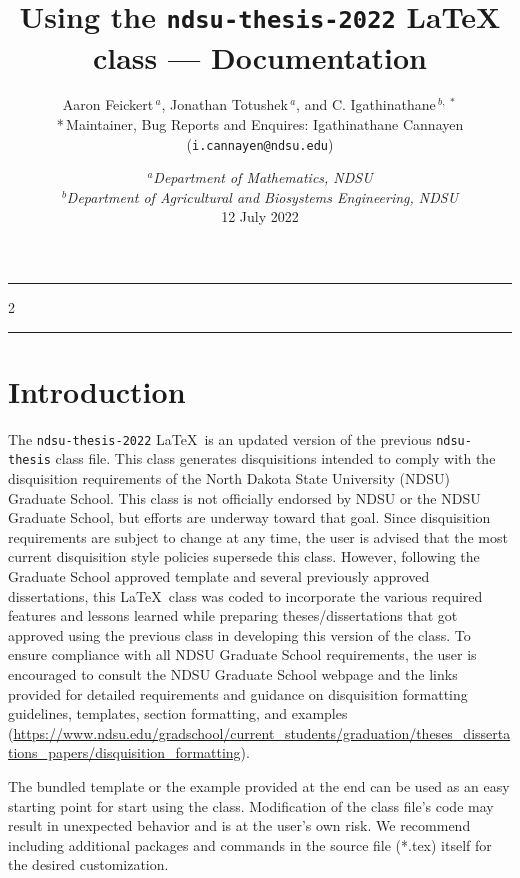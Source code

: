 \documentclass{article}
\title{\vspace{-1.5cm}Using the \texttt{ndsu-thesis-2022} \LaTeX\/ class --- Documentation}
\author{Aaron Feickert$\,^{a}$, Jonathan Totushek$\,^{a}$, and C. Igathinathane$\,^{b,\,*}$ \\ *\,Maintainer, Bug Reports and Enquires:  Igathinathane Cannayen (\texttt{i.cannayen@ndsu.edu})
}
\date{{\small $^{a}$\emph{Department of Mathematics, NDSU} \\ $^{b}$\emph{Department of Agricultural and Biosystems Engineering, NDSU}\\[2ex]}
12 July 2022}
\newcommand\ix[1]{#1\index{#1}} %
\begin{document}
\maketitle

\hrule
\begin{multicols}{2}
\scriptsize
\tableofcontents
\end{multicols}
\hrule

\section{Introduction}
The \texttt{ndsu-thesis-2022} \LaTeX\ is an updated version of the previous \texttt{ndsu-thesis} \ix{class} file. This class generates disquisitions intended to comply with the disquisition requirements of the North Dakota State University (NDSU) Graduate School. This class is not officially endorsed by NDSU or the NDSU Graduate School, but efforts are underway toward that goal. Since disquisition requirements are subject to change at any time, the user is advised that the most current disquisition style policies supersede this class. However, following the Graduate School approved template and several previously approved dissertations, this \LaTeX\ class was coded to incorporate the various required features and lessons learned while preparing theses/dissertations that got approved using the previous class in developing this version of the class. To ensure compliance with all NDSU Graduate School requirements, the user is encouraged to consult the NDSU Graduate School webpage and the links provided for detailed requirements and guidance on disquisition formatting guidelines, templates, section formatting, and examples (\url{https://www.ndsu.edu/gradschool/current_students/graduation/theses_dissertations_papers/disquisition_formatting}).

The bundled \ix{template} or the \ix{example} provided at the end can be used as an easy starting point for start using the class. Modification of the class file's code may result in unexpected behavior and is at the user's own risk. We recommend including additional packages and commands in the source file (*.tex) itself for the desired customization.

\end{document}
